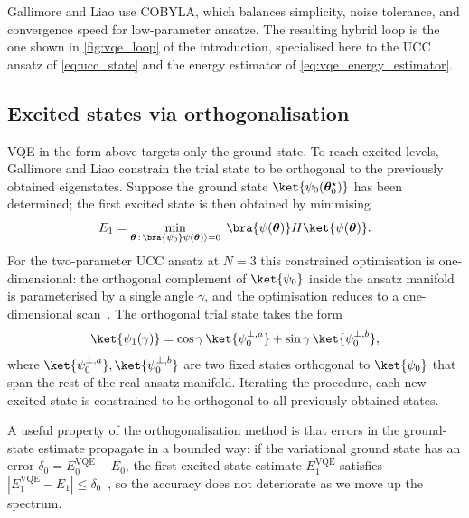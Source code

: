 Gallimore and Liao use COBYLA, which balances simplicity, noise tolerance,
and convergence speed for low-parameter ansatze. The resulting hybrid
loop is the one shown in \cref{fig:vqe_loop} of the introduction,
specialised here to the UCC ansatz of \cref{eq:ucc_state} and the energy
estimator of \cref{eq:vqe_energy_estimator}.

\subsection{Excited states via orthogonalisation}
\label{ssec:vqe_excited}

VQE in the form above targets only the ground state. To reach excited
levels, Gallimore and Liao constrain the trial state to be orthogonal to
the previously obtained eigenstates. Suppose the ground state
$\ket{\psi_0(\bm{\theta}_0^{\star})}$ has been determined; the first excited
state is then obtained by minimising
\begin{equation}
  \label{eq:vqe_excited}
  E_1 = \min_{\bm{\theta}\,:\,\bra{\psi_0}\psi(\bm{\theta})\rangle = 0}\;
        \bra{\psi(\bm{\theta})} H \ket{\psi(\bm{\theta})}.
\end{equation}
For the two-parameter UCC ansatz at $N=3$ this constrained optimisation is
one-dimensional: the orthogonal complement of $\ket{\psi_0}$ inside the
ansatz manifold is parameterised by a single angle $\gamma$, and the
optimisation reduces to a one-dimensional scan~\cite{gallimore2023}. The
orthogonal trial state takes the form
\begin{equation}
  \label{eq:orthogonal_state}
  \ket{\psi_1(\gamma)} =
    \cos\gamma\,\ket{\psi_0^{\perp,a}}
    + \sin\gamma\,\ket{\psi_0^{\perp,b}},
\end{equation}
where $\ket{\psi_0^{\perp,a}}, \ket{\psi_0^{\perp,b}}$ are two fixed states
orthogonal to $\ket{\psi_0}$ that span the rest of the real ansatz
manifold. Iterating the procedure, each new excited state is constrained
to be orthogonal to all previously obtained states.

\begin{remark}
A useful property of the orthogonalisation method is that errors in the
ground-state estimate propagate in a bounded way: if the variational ground
state has an error $\delta_0 = E_0^{\mathrm{VQE}} - E_0$, the first excited
state estimate $E_1^{\mathrm{VQE}}$ satisfies
$|E_1^{\mathrm{VQE}} - E_1| \leq \delta_0$~\cite{gallimore2023}, so the
accuracy does not deteriorate as we move up the spectrum.
\end{remark}

